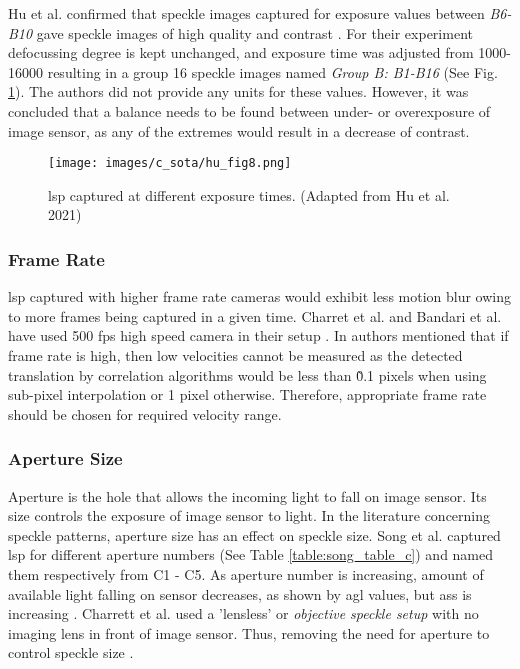     \vspace{5mm}

    \noindent Hu et al. confirmed that speckle images captured for exposure values between \emph{B6-B10} gave speckle images of high quality and contrast \noindent \cite{hu}. For their experiment defocussing degree is kept unchanged, and exposure time was adjusted from 1000-16000 resulting in a group 16 speckle images named \emph{Group B: B1-B16} (See Fig. \ref{fig:hu_fig8}). The authors did not provide any units for these values. However, it was concluded that a balance needs to be found between under- or overexposure of image sensor, as any of the extremes would result in a decrease of contrast.

    \begin{figure}[ht]
        \centering
        \texttt{[image: images/c\_sota/hu\_fig8.png]}
        \caption{\gls{lsp} captured at different exposure times. (Adapted from Hu et al. 2021) \cite{hu}}
        \label{fig:hu_fig8}
    \end{figure}

    \subsubsection{Frame Rate}\label{Subsubsection:Frame_Rate}
    \Gls{lsp} captured with higher frame rate cameras would exhibit less motion blur owing to more frames being captured in a given time. Charret et al. and Bandari et al. have used 500 \gls{fps} high speed camera in their setup \cite{charrett_2018} \cite{bandari}. In \cite{charrett_mars} authors mentioned that if frame rate is high, then low velocities cannot be measured as the detected translation by correlation algorithms would be less than \~0.1 pixels when using sub-pixel interpolation or 1 pixel otherwise. Therefore, appropriate frame rate should be chosen for required velocity range.

    
    \subsubsection{Aperture Size}
    Aperture is the hole that allows the incoming light to fall on image sensor. Its size controls the exposure of image sensor to light. In the literature concerning speckle patterns, aperture size has an effect on speckle size. Song et al. captured \gls{lsp} for different aperture numbers (See Table \ref{table:song_table_c}) and named them respectively from C1 - C5. As aperture number is increasing, amount of available light falling on sensor decreases, as shown by \gls{agl} values, but \gls{ass} is increasing \cite{song}. Charrett et al. used a 'lensless' or \emph{objective speckle setup} with no imaging lens in front of image sensor. Thus, removing the need for aperture to control speckle size \cite{charrett_2018, francis_autonomous}.
    
